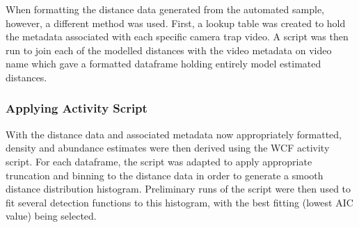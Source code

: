 When formatting the distance data generated from the automated sample, however, a
different method was used.
First, a lookup table was created to hold the metadata associated with each specific
camera trap video.
A script was then run to join each of the modelled distances with the video metadata
on video name which gave a formatted dataframe holding entirely model estimated distances.

\subsubsection{Applying Activity Script}

With the distance data and associated metadata now appropriately formatted, density
and abundance estimates were then derived using the WCF activity script.
For each dataframe, the script was adapted to apply appropriate truncation and binning
to the distance data in order to generate a smooth distance distribution histogram.\cite{distance_samping}
Preliminary runs of the script were then used to fit several detection functions to
this histogram, with the best fitting (lowest AIC value) being selected.\cite{distance_samping}